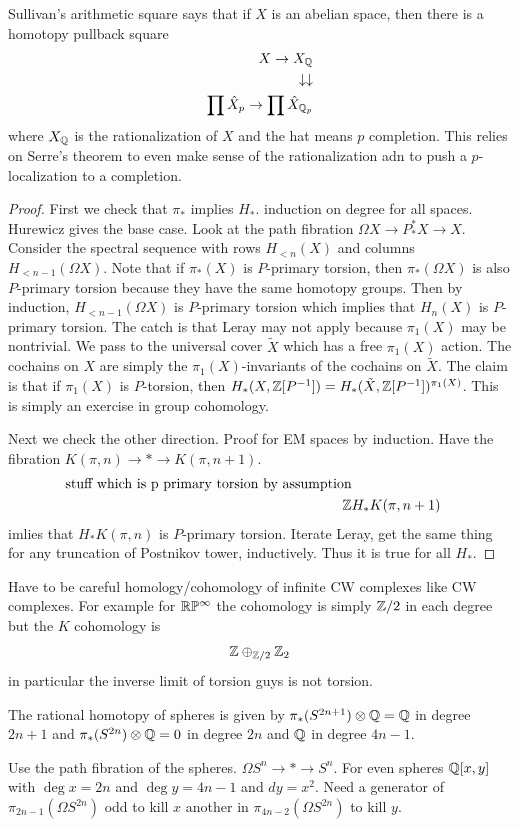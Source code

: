 \documentclass[12pt]{article}
\begin{document}
Sullivan's arithmetic square says that if $X$ is an abelian space, then there is a homotopy pullback square \begin{align*}
    X \to X_{\mathbb{Q}} \\
    \downarrow \downarrow \\
    \prod \hat{X}_p \to \prod \hat{X}_{\mathbb{Q}_p}
\end{align*} where $X_{\mathbb{Q}}$ is the rationalization of $X$ and the hat means $p$ completion. This relies on Serre's theorem to even make sense of the rationalization adn to push a $p$-localization to a completion.

\begin{proof}
   First we check that $\pi_*$ implies $H_*$. induction on degree for all spaces. Hurewicz gives the base case. Look at the path fibration $\Omega X \to P^*_* X \to X$. Consider the spectral sequence with rows $H_{<n}(X)$ and columns $H_{<n-1}(\Omega X)$. Note that if $\pi_*(X)$ is $P$-primary torsion, then $\pi_*(\Omega X)$ is also $P$-primary torsion because they have the same homotopy groups. Then by induction, $H_{<n-1}(\Omega X)$ is $P$-primary torsion which implies that $H_n(X)$ is $P$-primary torsion.
    The catch is that Leray may not apply because $\pi_1(X)$ may be nontrivial. We pass to the universal cover $\tilde{X}$ which has a free $\pi_1(X)$ action. The cochains on $X$ are simply the $\pi_1(X)$-invariants of the cochains on $\tilde{X}$. The claim is that if $\pi_1(X)$ is $P$-torsion, then $H_*(X,\mathbb{Z}[P^{-1}]) = H_*(\tilde{X},\mathbb{Z}[P^{-1}])^{\pi_1(X)}$. This is simply an exercise in group cohomology. 

    Next we check the other direction. Proof for EM spaces by induction. Have the fibration $K(\pi,n) \to * \to K(\pi,n+1)$. \begin{align*}
        \text{stuff which is p primary torsion by assumption} \\
        \mathbb{Z} & H_*K(\pi,n+1)
    \end{align*}  imlies that $H_* K(\pi,n)$ is $P$-primary torsion. Iterate Leray, get the same thing for any truncation of Postnikov tower, inductively. Thus it is true for all $H_*$.
\end{proof}

Have to be careful homology/cohomology of infinite CW complexes like CW complexes. For example for $\mathbb{R}\mathbb{P}^\infty$ the cohomology is simply $\mathbb{Z}/2$ in each degree but the $K$ cohomology is \begin{align*}
    \mathbb{Z} \oplus_{\mathbb{Z}/2} \mathbb{Z}_2
\end{align*} in particular the inverse limit of torsion guys is not torsion.
\begin{theorem}
    The rational homotopy of spheres is given by $\pi_*(S^{2n+1}) \otimes \mathbb{Q} = \mathbb{Q}$ in degree $2n+1$ and  $\pi_*(S^{2n}) \otimes \mathbb{Q} = 0$ in degree $2n$ and $\mathbb{Q}$ in degree $4n-1$.
\end{theorem}
Use the path fibration of the spheres. $\Omega S^n \to * \to S^n$. For even spheres $\mathbb{Q}[x,y]$ with $\deg x = 2n$ and $\deg y = 4n-1$ and $d y = x^2$. Need a generator of $\pi_{2n-1}(\Omega S^{2n})$ odd to kill $x$ another in $\pi_{4n-2}(\Omega S^{2n})$ to kill $y$.
\end{document}
